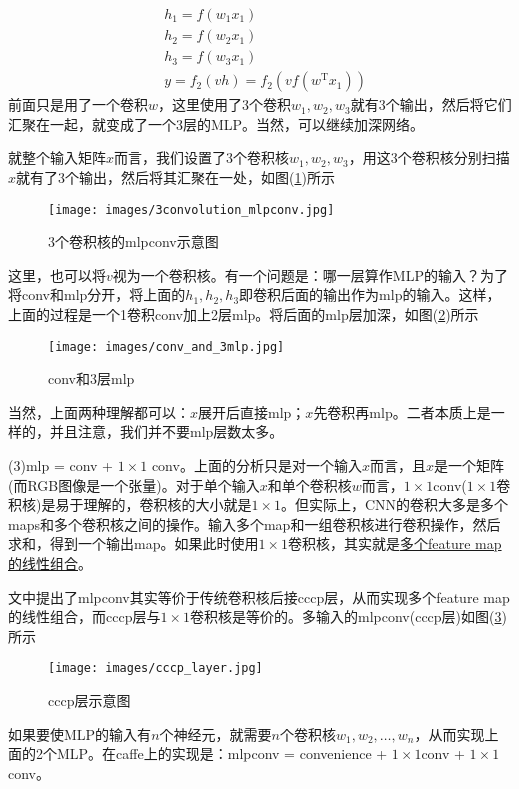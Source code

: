             \begin{align*}
            & h_1 = f(w_1x_1)\\
            & h_2 = f(w_2x_1)\\
            & h_3=f(w_3x_1)\\
            & y=f_2(vh) = f_2(vf(w^\mathrm{T}x_1))
            \end{align*}
            前面只是用了一个卷积$w$，这里使用了3个卷积$w_1,w_2,w_3$就有3个输出，然后将它们汇聚在一起，就变成了一个3层的MLP。当然，可以继续加深网络。
            \par
            就整个输入矩阵$x$而言，我们设置了3个卷积核$w_1,w_2,w_3$，用这3个卷积核分别扫描$x$就有了3个输出，然后将其汇聚在一处，如图(\ref{fig:3个卷积核的mlpconv示意图})所示
             \begin{figure}[H]
            \centering
            \texttt{[image: images/3convolution\_mlpconv.jpg]}
            \caption{3个卷积核的mlpconv示意图}
            \label{fig:3个卷积核的mlpconv示意图}
            \end{figure}
            这里，也可以将$v$视为一个卷积核。有一个问题是：哪一层算作MLP的输入？为了将conv和mlp分开，将上面的$h_1,h_2,h_3$即卷积后面的输出作为mlp的输入。这样，上面的过程是一个1卷积conv加上2层mlp。将后面的mlp层加深，如图(\ref{fig:conv和3层mlp})所示
             \begin{figure}[H]
            \centering
            \texttt{[image: images/conv\_and\_3mlp.jpg]}
            \caption{conv和3层mlp}
            \label{fig:conv和3层mlp}
            \end{figure}
            \par
            当然，上面两种理解都可以：$x$展开后直接mlp；$x$先卷积再mlp。二者本质上是一样的，并且注意，我们并不要mlp层数太多。
            \par
            (3)mlp = conv + $1\times 1$ conv。上面的分析只是对一个输入$x$而言，且$x$是一个矩阵(而RGB图像是一个张量)。对于单个输入$x$和单个卷积核$w$而言，$1\times 1$conv($1\times 1$卷积核)是易于理解的，卷积核的大小就是$1\times 1$。但实际上，CNN的卷积大多是多个maps和多个卷积核之间的操作。输入多个map和一组卷积核进行卷积操作，然后求和，得到一个输出map。如果此时使用$1\times 1$卷积核，其实就是\uline{多个feature map的线性组合}。
            \par
            文中提出了mlpconv其实等价于传统卷积核后接cccp层，从而实现多个feature map的线性组合，而cccp层与$1\times 1$卷积核是等价的。多输入的mlpconv(cccp层)如图(\ref{fig:cccp层示意图})所示
             \begin{figure}[H]
            \centering
            \texttt{[image: images/cccp\_layer.jpg]}
            \caption{cccp层示意图}
            \label{fig:cccp层示意图}
            \end{figure}
            如果要使MLP的输入有$n$个神经元，就需要$n$个卷积核$w_1,w_2,\dots,w_n$，从而实现上面的2个MLP。在caffe上的实现是：mlpconv = convenience + $1\times 1$conv + $1\times 1$conv。

